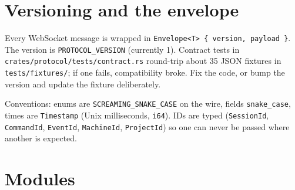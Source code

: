 \section{\texorpdfstring{Versioning and the envelope}{Versioning and the envelope}}

Every WebSocket message is wrapped in \texttt{Envelope\textless{}T\textgreater{}\ \{\ version,\allowbreak{}\ payload\ \}}. The version is \texttt{PROTOCOL\_\allowbreak{}VERSION} (currently 1). Contract tests in \texttt{crates/\allowbreak{}protocol/\allowbreak{}tests/\allowbreak{}contract.\allowbreak{}rs} round-trip about 35 JSON fixtures in \texttt{tests/\allowbreak{}fixtures/\allowbreak{}}; if one fails, compatibility broke. Fix the code, or bump the version and update the fixture deliberately.

Conventions: enums are \texttt{SCREAMING\_\allowbreak{}SNAKE\_\allowbreak{}CASE} on the wire, fields \texttt{snake\_\allowbreak{}case}, times are \texttt{Timestamp} (Unix milliseconds, \texttt{i64}). IDs are typed (\texttt{SessionId}, \texttt{CommandId}, \texttt{EventId}, \texttt{MachineId}, \texttt{ProjectId}) so one can never be passed where another is expected.

\section{\texorpdfstring{Modules}{Modules}}

